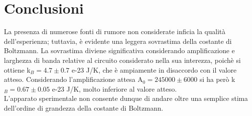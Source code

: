 \section{Conclusioni}
La presenza di numerose fonti di rumore non considerate inficia la qualità dell'esperienza; tuttavia, è evidente una leggera sovrastima della costante di Boltzmann. La sovrastima diviene significativa considerando amplificazione e larghezza di banda relative al circuito considerato nella sua interezza, poichè si ottiene  k$_B = 4.7 \pm 0.7$ e-23 J/K, che è ampiamente in disaccordo con il valore atteso. Considerando l'amplificazione attesa A$_0 = 245000 \pm 6000$ si ha però k$_B = 0.67 \pm 0.05$ e-23 J/K, molto inferiore al valore atteso.\\
L'apparato sperimentale non consente dunque di andare oltre una semplice stima dell'ordine di grandezza della costante di Boltzmann.